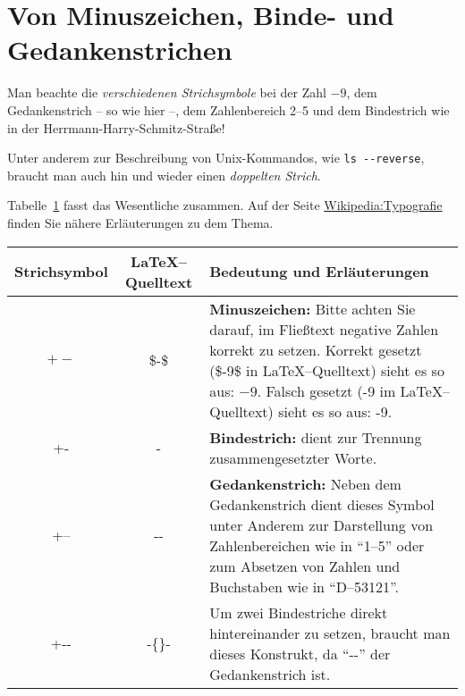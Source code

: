 \documentclass[12pt,a4paper]{scrartcl}
\begin{document}
%
\section*{Von Minuszeichen, Binde- und Gedankenstrichen}
Man beachte die \emph{verschiedenen Strichsymbole} bei der Zahl $-9$,
dem Gedankenstrich -- so wie hier --, dem Zahlenbereich 2--5 und dem
Bindestrich wie in der Herrmann-Harry-Schmitz-Straße!

Unter anderem zur Beschreibung von Unix-Kommandos, wie \texttt{ls
  -{}-reverse}, braucht man auch hin und wieder einen \emph{doppelten
  Strich}.

Tabelle~\ref{tab:strichsymbole} fasst das Wesentliche zusammen. Auf
der Seite
\href{https://de.wikipedia.org/wiki/Wikipedia:Typografie#Bindestrich.2C_Gedankenstrich.2C_Minuszeichen_und_andere_waagerechte_Striche}{Wikipedia:Typografie}
finden Sie nähere Erläuterungen zu dem Thema.
%
\begin{table}[h]
  \centering
  \label{tab:strichsymbole}
  \begin{tabularx}{\textwidth}{ccX}
    \toprule
    Strichsymbol & \LaTeX--Quelltext & Bedeutung und Erläuterungen \\
    \midrule
    $+-$ & \$-\$ & \textbf{Minuszeichen:} Bitte achten Sie darauf, im
      Fließtext negative Zahlen korrekt zu setzen. Korrekt gesetzt
      (\$-9\$ in \LaTeX--Quelltext) sieht es so aus: $-9$. Falsch
      gesetzt (-9 im \LaTeX--Quelltext) sieht es so aus: -9.\\
    +- & - & \textbf{Bindestrich:} dient zur Trennung
      zusammengesetzter Worte. \\
    +-- & -{}- & \textbf{Gedankenstrich:} Neben dem Gedankenstrich
      dient dieses Symbol unter Anderem zur Darstellung von
      Zahlenbereichen wie in \enquote{1--5} oder zum Absetzen
      von Zahlen und Buchstaben wie in \enquote{D--53121}. \\
    +-{}- & -\{\}- & Um zwei Bindestriche direkt hintereinander zu
      setzen, braucht man dieses Konstrukt, da \enquote{-{}-} der
      Gedankenstrich ist. \\
      \bottomrule
  \end{tabularx}
\end{table}
\end{document}
